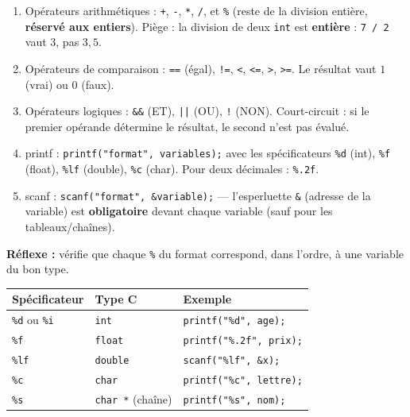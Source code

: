 \documentclass[11pt]{article}
\newcommand{\cle}[1]{{\popxbold\color{popdark}#1}}
\begin{document}
\begin{methode}
\begin{enumerate}
\item \cle{Opérateurs arithmétiques} : \texttt{+}, \texttt{-}, \texttt{*}, \texttt{/}, et \texttt{\%} (reste de la division entière, \textbf{réservé aux entiers}). Piège : la division de deux \texttt{int} est \textbf{entière} : \texttt{7 / 2} vaut $3$, pas $3{,}5$.
\item \cle{Opérateurs de comparaison} : \texttt{==} (égal), \texttt{!=}, \texttt{<}, \texttt{<=}, \texttt{>}, \texttt{>=}. Le résultat vaut $1$ (vrai) ou $0$ (faux).
\item \cle{Opérateurs logiques} : \texttt{\&\&} (ET), \texttt{||} (OU), \texttt{!} (NON). Court-circuit : si le premier opérande détermine le résultat, le second n'est pas évalué.
\item \cle{printf} : \texttt{printf("format", variables);} avec les spécificateurs \texttt{\%d} (int), \texttt{\%f} (float), \texttt{\%lf} (double), \texttt{\%c} (char). Pour deux décimales : \texttt{\%.2f}.
\item \cle{scanf} : \texttt{scanf("format", \&variable);} — l'\cle{esperluette \texttt{\&}} (adresse de la variable) est \textbf{obligatoire} devant chaque variable (sauf pour les tableaux/chaînes).
\end{enumerate}
\textbf{Réflexe :} vérifie que chaque \texttt{\%} du format correspond, dans l'ordre, à une variable du bon type.
\end{methode}

\begin{propriete}
\begin{center}
\begin{tabular}{|l|l|l|}
\hline
\rowcolor{popblueL} \textbf{Spécificateur} & \textbf{Type C} & \textbf{Exemple} \\
\hline
\texttt{\%d} ou \texttt{\%i} & \texttt{int} & \texttt{printf("\%d", age);} \\
\hline
\texttt{\%f} & \texttt{float} & \texttt{printf("\%.2f", prix);} \\
\hline
\texttt{\%lf} & \texttt{double} & \texttt{scanf("\%lf", \&x);} \\
\hline
\texttt{\%c} & \texttt{char} & \texttt{printf("\%c", lettre);} \\
\hline
\texttt{\%s} & \texttt{char *} (chaîne) & \texttt{printf("\%s", nom);} \\
\hline
\end{tabular}
\end{center}
\end{propriete}
\end{document}
